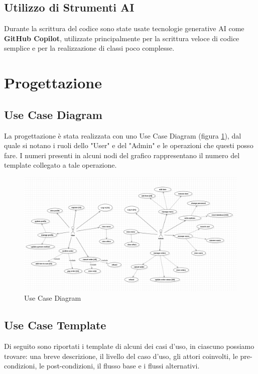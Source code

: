 \documentclass{article}
\begin{document}
\subsection{Utilizzo di Strumenti AI}
Durante la scrittura del codice sono state usate tecnologie generative AI come \textbf{GitHub Copilot}, utilizzate principalmente per la scrittura veloce di codice semplice e per la realizzazione di classi poco complesse. \\


\section{Progettazione}

\subsection{Use Case Diagram}
La progettazione è stata realizzata con uno Use Case Diagram (figura \ref{useCaseDiagram}), dal quale si notano i ruoli dello "User" e del "Admin" e le operazioni che questi posso fare. I numeri presenti in alcuni nodi del grafico rappresentano il numero del template collegato a tale operazione.

\begin{figure}[h]
    \hspace*{-2.5cm}
    \includegraphics[width=1.45\textwidth]{imgs/UseCaseDiagramVer2.png}
    \caption{Use Case Diagram}
    \label{useCaseDiagram}
\end{figure}

\clearpage

\subsection{Use Case Template} \label{subsec:use-case-template}
    Di seguito sono riportati i template di alcuni dei casi d'uso, in ciascuno possiamo trovare: una breve descrizione,
    il livello del caso d'uso, gli attori coinvolti, le pre-condizioni, le post-condizioni, il flusso base e i flussi alternativi. \\
\end{document}
